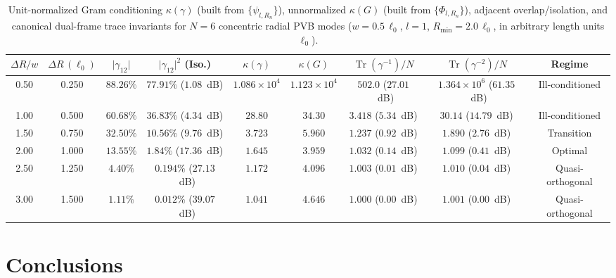 \documentclass[aps,pra,reprint,nofootinbib,floatfix,longbibliography]{revtex4-2}
\theoremstyle{remark}
\newcommand{\abs}[1]{\lvert #1 \rvert}
\begin{document}
\begin{table}[t]
\caption{Unit-normalized Gram conditioning $\kappa(\gamma)$ (built from $\{\psi_{l,R_n}\}$), unnormalized $\kappa(G)$ (built from $\{\Phi_{l,R_n}\}$), adjacent overlap/isolation, and canonical dual-frame trace invariants for $N = 6$ concentric radial PVB modes ($w = 0.5\,\ell_0$, $l = 1$, $R_{\min} = 2.0\,\ell_0$, in arbitrary length units $\ell_0$).}
\label{tab:gram_matrix}
\begin{ruledtabular}
\footnotesize
\setlength{\tabcolsep}{2.5pt}
\begin{tabular}{ccccccccc}
$\Delta R / w$ & $\Delta R\,(\ell_0)$ & $\abs{\gamma_{12}}$ & $\abs{\gamma_{12}}^2$ (Iso.) & $\kappa(\gamma)$ & $\kappa(G)$ & $\operatorname{Tr}(\gamma^{-1})/N$ & $\operatorname{Tr}(\gamma^{-2})/N$ & Regime \\
\hline
0.50 & 0.250 & $88.26\%$ & $77.91\%$ ($1.08$~dB) & $1.086\times 10^4$ & $1.123\times 10^4$ & $502.0$ ($27.01$~dB) & $1.364\times 10^6$ ($61.35$~dB) & Ill-conditioned \\
1.00 & 0.500 & $60.68\%$ & $36.83\%$ ($4.34$~dB) & $28.80$ & $34.30$ & $3.418$ ($5.34$~dB) & $30.14$ ($14.79$~dB) & Ill-conditioned \\
1.50 & 0.750 & $32.50\%$ & $10.56\%$ ($9.76$~dB) & $3.723$ & $5.960$ & $1.237$ ($0.92$~dB) & $1.890$ ($2.76$~dB) & Transition \\
2.00 & 1.000 & $13.55\%$ & $1.84\%$ ($17.36$~dB) & $1.645$ & $3.959$ & $1.032$ ($0.14$~dB) & $1.099$ ($0.41$~dB) & Optimal \\
2.50 & 1.250 & $4.40\%$ & $0.194\%$ ($27.13$~dB) & $1.172$ & $4.096$ & $1.003$ ($0.01$~dB) & $1.010$ ($0.04$~dB) & Quasi-orthogonal \\
3.00 & 1.500 & $1.11\%$ & $0.012\%$ ($39.07$~dB) & $1.041$ & $4.646$ & $1.000$ ($0.00$~dB) & $1.001$ ($0.00$~dB) & Quasi-orthogonal \\
\end{tabular}
\end{ruledtabular}
\end{table}

\section{Conclusions}
\label{sec:conclusions}
\end{document}
